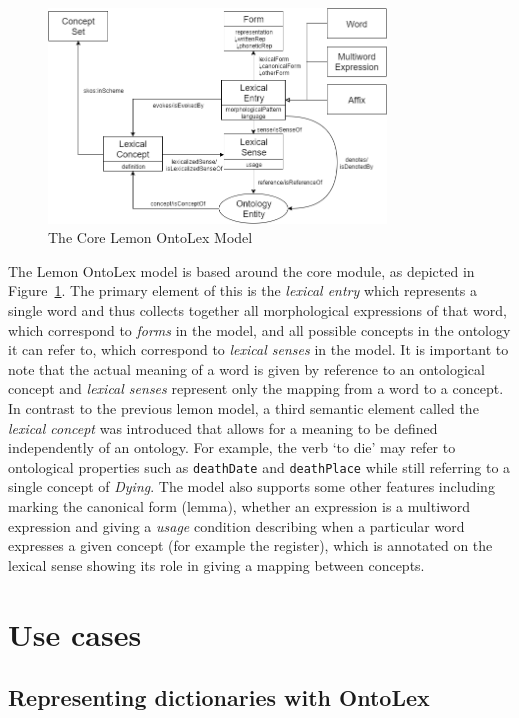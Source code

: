 \documentclass[12pt,a4paper]{elex2017}
\begin{document}
\begin{figure}
\includegraphics[width=0.8\textwidth]{Lemon_OntoLex_Core.png}
\caption{\label{fig:core}The Core Lemon OntoLex Model}
\end{figure}

The Lemon OntoLex model is based around the core module, as depicted in
Figure~\ref{fig:core}. The primary element of this is the \emph{lexical entry}
which represents a single word and thus collects together all morphological
expressions of that word, which correspond to \emph{forms} in the model, and all
possible concepts in the ontology it can refer to, which correspond to
\emph{lexical senses} in the model. It is important to note that the actual
meaning of a word is given by reference to an ontological concept and
\emph{lexical senses} represent only the mapping from a word to a concept. In
contrast to the previous lemon model, a third semantic element called the
\emph{lexical concept} was introduced that allows for a meaning to be defined
independently of an ontology. For example, the verb `to die' may refer to
ontological properties such as \texttt{deathDate} and \texttt{deathPlace} while
still referring to a single concept of \emph{Dying}. The model also supports
some other features including marking the canonical form (lemma), whether an
expression is a multiword expression and giving a \emph{usage} condition
describing when a particular word expresses a given concept (for example the
register), which is annotated on the lexical sense showing its role in giving a
mapping between concepts.



\section{Use cases}

\subsection{Representing dictionaries with OntoLex}
\end{document}
